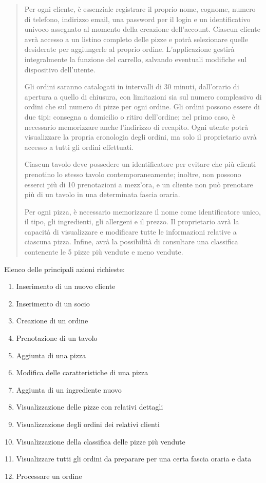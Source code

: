 \documentclass[a4paper,12pt, oneside]{article}
\begin{document}
\begin{quote}

Per ogni cliente, è essenziale registrare il proprio nome, cognome,
numero di telefono, indirizzo email, una password per il login e un
identificativo univoco assegnato al momento della creazione
dell'account. Ciascun cliente avrà accesso a un listino completo delle
pizze e potrà selezionare quelle desiderate per aggiungerle al proprio
ordine. L'applicazione gestirà integralmente la funzione del carrello,
salvando eventuali modifiche sul dispositivo dell'utente.

Gli ordini saranno catalogati in intervalli di 30 minuti,
dall'orario di apertura a quello di chiusura, con limitazioni sia sul
numero complessivo di ordini che sul numero di pizze per ogni ordine.
Gli ordini possono essere di due tipi: consegna a domicilio o ritiro
dell'ordine; nel primo caso, è necessario memorizzare anche
l'indirizzo di recapito. Ogni utente potrà visualizzare la propria
cronologia degli ordini, ma solo il proprietario avrà accesso a tutti
gli ordini effettuati.

Ciascun tavolo deve possedere un identificatore per evitare che più
clienti prenotino lo stesso tavolo contemporaneamente; inoltre, non
possono esserci più di 10 prenotazioni a mezz'ora, e un cliente non
può prenotare più di un tavolo in una determinata fascia oraria.

Per ogni pizza, è necessario memorizzare il nome come identificatore
unico, il tipo, gli ingredienti, gli allergeni e il prezzo. Il
proprietario avrà la capacità di visualizzare e modificare tutte le
informazioni relative a ciascuna pizza. Infine, avrà la possibilità
di consultare una classifica contenente le 5 pizze più vendute e
meno vendute.

\end{quote}

Elenco delle principali azioni richieste:
\begin{enumerate}
    \item Inserimento di un nuovo cliente
    \item Inserimento di un socio
    \item Creazione di un ordine
    \item Prenotazione di un tavolo
    \item Aggiunta di una pizza
    \item Modifica delle caratteristiche di una pizza
    \item Aggiunta di un ingrediente nuovo
    \item Visualizzazione delle pizze con relativi dettagli
    \item Visualizzazione degli ordini dei relativi clienti
    \item Visualizzazione della classifica delle pizze più vendute
    \item Visualizzare tutti gli ordini da preparare per una certa fascia oraria e data
    \item Processare un ordine
\end{enumerate}
\end{document}
